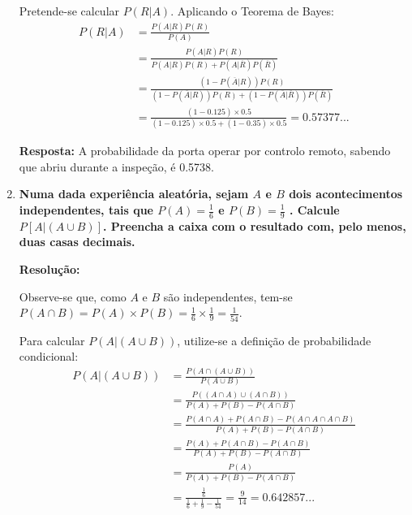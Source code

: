 \documentclass[a4paper,12pt]{article}
\begin{document}
\begin{enumerate}
\begin{mdframed}[backgroundcolor=gray!10, linewidth=0pt, innertopmargin=10pt, innerbottommargin=10pt]
  Pretende-se calcular $P(R|A)$. Aplicando o Teorema de Bayes:
  \begin{align*}
    P(R|A) &= \frac{P(A|R)P(R)}{P(A)} \\
    &= \frac{P(A|R)P(R)}{P(A|R)P(R) + P(A|\overline{R})P(\overline{R})} \\
    &= \frac{(1 - P(\overline{A}|R))P(R)}{(1 - P(\overline{A}|R))P(R) + (1 - P(\overline{A}|\overline{R}))P(\overline{R})} \\
    &= \frac{(1 - 0.125) \times 0.5}{(1 - 0.125) \times 0.5 + (1 - 0.35) \times 0.5} = 0.57377...
  \end{align*}

  \textbf{Resposta:} A probabilidade da porta operar por controlo remoto, sabendo que abriu durante a inspeção, é 0.5738.
  \end{mdframed}

  \vspace{0.5cm}

  \item \textbf{Numa dada experiência aleatória, sejam $A$ e $B$ dois acontecimentos independentes, tais que $P(A)= \frac{1}{6}$ e $P(B)= \frac{1}{9}$ . Calcule $P[A|(A\cup B)]$. Preencha a caixa com o resultado com, pelo menos, duas casas decimais.}
  
  \vspace{0.3cm}
  
  \begin{mdframed}[backgroundcolor=gray!10, linewidth=0pt, innertopmargin=10pt, innerbottommargin=10pt]
  \textbf{Resolução:}
  
  Observe-se que, como $A$ e $B$ são independentes, tem-se $P(A \cap B) = P(A) \times P(B) = \frac{1}{6} \times \frac{1}{9} = \frac{1}{54}$. 
  
  Para calcular $P(A|(A\cup B))$, utilize-se a definição de probabilidade condicional:
  \begin{align*}
    P(A|(A\cup B)) &= \frac{P(A \cap (A\cup B))}{P(A\cup B)} \\
    &= \frac{P((A \cap A) \cup (A \cap B))}{P(A) + P(B) - P(A \cap B)} \\
    &= \frac{P(A\cap A) + P(A \cap B) - P(A \cap A \cap A \cap B)}{P(A) + P(B) - P(A \cap B)} \\
    &= \frac{P(A) + P(A \cap B) - P(A \cap B)}{P(A) + P(B) - P(A \cap B)} \\
    &= \frac{P(A)}{P(A) + P(B) - P(A \cap B)} \\
    &= \frac{\frac{1}{6}}{\frac{1}{6} + \frac{1}{9} - \frac{1}{54}} = \frac{9}{14} = 0.642857...
  \end{align*}


\end{mdframed}
\end{enumerate}
\end{document}
